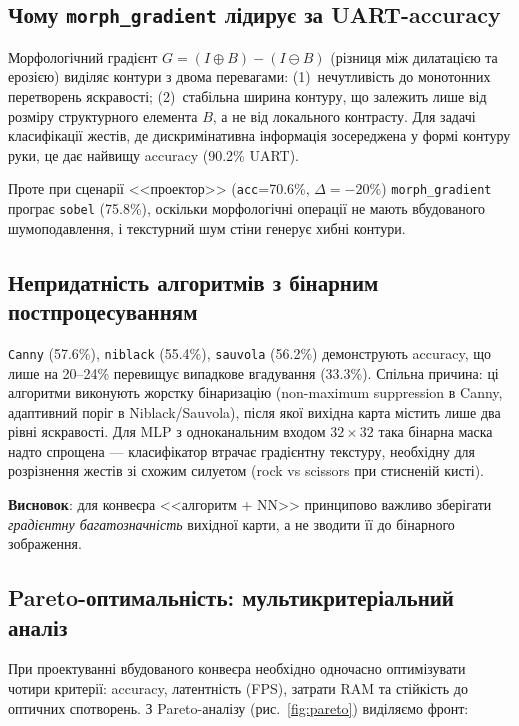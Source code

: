 \documentclass[a4paper,12pt]{article}
\begin{document}
\subsection{Чому \texttt{morph\_gradient} лідирує за UART-accuracy}

Морфологічний градієнт $G = (I \oplus B) - (I \ominus B)$ (різниця між дилатацією та ерозією) виділяє контури з двома перевагами: (1)~нечутливість до монотонних перетворень яскравості; (2)~стабільна ширина контуру, що залежить лише від розміру структурного елемента $B$, а не від локального контрасту. Для задачі класифікації жестів, де дискримінативна інформація зосереджена у формі контуру руки, це дає найвищу accuracy (90.2\% UART).

Проте при сценарії <<проектор>> (\texttt{acc}=70.6\%, $\Delta=-20\%$) \texttt{morph\_gradient} програє \texttt{sobel} (75.8\%), оскільки морфологічні операції не мають вбудованого шумоподавлення, і текстурний шум стіни генерує хибні контури.

\subsection{Непридатність алгоритмів з бінарним постпроцесуванням}

\texttt{Canny} (57.6\%), \texttt{niblack} (55.4\%), \texttt{sauvola} (56.2\%) демонструють accuracy, що лише на 20--24\% перевищує випадкове вгадування (33.3\%). Спільна причина: ці алгоритми виконують жорстку бінаризацію (non-maximum suppression в Canny, адаптивний поріг в Niblack/Sauvola), після якої вихідна карта містить лише два рівні яскравості. Для MLP з одноканальним входом $32\times32$ така бінарна маска надто спрощена --- класифікатор втрачає градієнтну текстуру, необхідну для розрізнення жестів зі схожим силуетом (rock vs scissors при стисненій кисті).

\textbf{Висновок}: для конвеєра <<алгоритм + NN>> принципово важливо зберігати \emph{градієнтну багатозначність} вихідної карти, а не зводити її до бінарного зображення.

\subsection{Pareto-оптимальність: мультикритеріальний аналіз}

При проектуванні вбудованого конвеєра необхідно одночасно оптимізувати чотири критерії: accuracy, латентність (FPS), затрати RAM та стійкість до оптичних спотворень. З Pareto-аналізу (рис.~\ref{fig:pareto}) виділяємо фронт:
\end{document}
